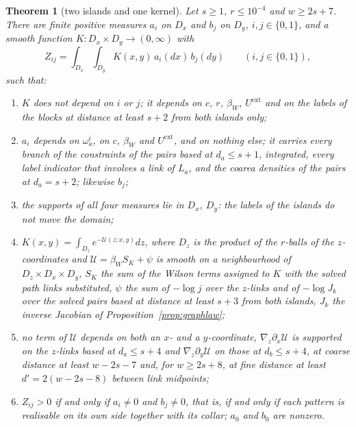 \documentclass[11pt]{amsart}
\newtheorem{theorem}{Theorem}[section]
\theoremstyle{definition}
\theoremstyle{remark}
\numberwithin{equation}{section}
\begin{document}
\begin{theorem}[two islands and one kernel]\label{thm:factorisation}
Let $s\ge1$, $r\le10^{-4}$ and $w\ge2s+7$. There are finite positive
measures $a_i$ on $D_x$ and $b_j$ on $D_y$, $i,j\in\{0,1\}$, and a smooth
function $K:D_x\times D_y\to(0,\infty)$ with
\[
Z_{ij}=\int_{D_x}\int_{D_y}K(x,y)\,a_i(dx)\,b_j(dy)\qquad(i,j\in\{0,1\}),
\]
such that:
\begin{enumerate}[label=\textup{(\roman*)},leftmargin=*]
\item $K$ does not depend on $i$ or $j$; it depends on $c$, $r$,
$\beta_W$, $U^{\mathrm{ext}}$ and on the labels of the blocks at distance
at least $s+2$ from both islands only;
\item $a_i$ depends on $\omega_a^i$, on $c$, $\beta_W$ and
$U^{\mathrm{ext}}$, and on nothing else; it carries every branch of the
constraints of the pairs based at $d_a\le s+1$, integrated, every label
indicator that involves a link of $L_a$, and the coarea densities of the
pairs at $d_a=s+2$; likewise $b_j$;
\item the supports of all four measures lie in $D_x$, $D_y$: the labels
of the islands do not move the domain;
\item $K(x,y)=\int_{D_z}e^{-\mathcal U(z;x,y)}dz$, where $D_z$ is the
product of the $r$-balls of the $z$-coordinates and
$\mathcal U=\beta_WS_K+\psi$ is smooth on a neighbourhood of
$D_z\times D_x\times D_y$, $S_K$ the sum of the Wilson terms assigned to
$K$ with the solved path links substituted, $\psi$ the sum of
$-\log j$ over the $z$-links and of $-\log J_k$ over the solved pairs
based at distance at least $s+3$ from both islands, $J_k$ the inverse
Jacobian of Proposition~\ref{prop:graphlaw};
\item no term of $\mathcal U$ depends on both an $x$- and a
$y$-coordinate, $\nabla_z\partial_x\mathcal U$ is supported on the
$z$-links based at $d_a\le s+4$ and $\nabla_z\partial_y\mathcal U$ on those
at $d_b\le s+4$, at coarse distance at least $w-2s-7$ and, for
$w\ge2s+8$, at fine distance at least $d'=2(w-2s-8)$ between link
midpoints;
\item $Z_{ij}>0$ if and only if $a_i\ne0$ and $b_j\ne0$, that is, if and
only if each pattern is realisable on its own side together with its
collar; $a_0$ and $b_0$ are nonzero.
\end{enumerate}
\end{theorem}
\end{document}
